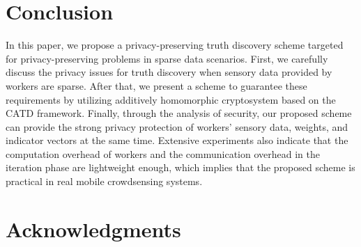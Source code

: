 \documentclass[conference]{IEEEtran}
\begin{document}
\section{Conclusion}\label{sec8}
In this paper, we propose a privacy-preserving truth discovery scheme targeted for privacy-preserving problems in sparse data scenarios.
First, we carefully discuss the privacy issues for truth discovery when sensory data provided by workers are sparse.
After that, we present a scheme to guarantee these requirements by utilizing additively homomorphic cryptosystem based on the CATD framework.
Finally, through the analysis of security, our proposed scheme can provide the strong privacy protection of workers' sensory data, weights, and indicator vectors at the same time.
Extensive experiments also indicate that the computation overhead of workers and the communication overhead in the iteration phase are lightweight enough, which implies that the proposed scheme is practical in real mobile crowdsensing systems.

\section*{Acknowledgments}




\vspace{12pt}
\end{document}
